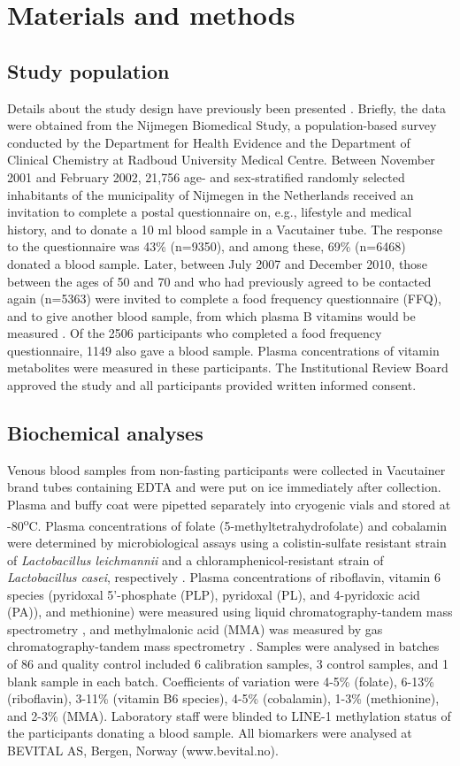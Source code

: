 \section{Materials and methods} %
\subsection{Study population}
\noindent Details about the study design have previously been presented \cite{c321}. Briefly, the data were obtained from the Nijmegen Biomedical Study, a population-based survey conducted by the Department for Health Evidence and the Department of Clinical Chemistry at Radboud University Medical Centre. Between November 2001 and February 2002, 21,756 age- and sex-stratified randomly selected inhabitants of the municipality of Nijmegen in the Netherlands received an invitation to complete a postal questionnaire on, e.g., lifestyle and medical history, and to donate a 10 ml blood sample in a Vacutainer tube. The response to the questionnaire was 43\% (n=9350), and among these, 69\% (n=6468) donated a blood sample. Later, between July 2007 and December 2010, those between the ages of 50 and 70 and who had previously agreed to be contacted again (n=5363) were invited to complete a food frequency questionnaire (FFQ), and to give another blood sample, from which plasma B vitamins would be measured \cite{c322}. Of the 2506 participants who completed a food frequency questionnaire, 1149 also gave a blood sample. Plasma concentrations of vitamin metabolites were measured in these participants. The Institutional Review Board approved the study and all participants provided written informed consent.

\subsection{Biochemical analyses} %
\noindent Venous blood samples from non-fasting participants were collected in Vacutainer brand tubes containing EDTA and were put on ice immediately after collection. Plasma and buffy coat were pipetted separately into cryogenic vials and stored at -80\textsuperscript{o}C. Plasma concentrations of folate (5-methyltetrahydrofolate) and cobalamin were determined by microbiological assays using a colistin-sulfate resistant strain of \emph{Lactobacillus leichmannii} and a chloramphenicol-resistant strain of \emph{Lactobacillus casei}, respectively \cite{c323,c324}. Plasma concentrations of riboflavin, vitamin 6 species (pyridoxal 5'-phosphate (PLP), pyridoxal (PL), and 4-pyridoxic acid (PA)), and methionine) were measured using liquid chromatography-tandem mass spectrometry \cite{c325,c326}, and methylmalonic acid (MMA) was measured by gas chromatography-tandem mass spectrometry \cite{c327}. Samples were analysed in batches of 86 and quality control included 6 calibration samples, 3 control samples, and 1 blank sample in each batch. Coefficients of variation were 4-5\% (folate), 6-13\% (riboflavin), 3-11\% (vitamin B6 species), 4-5\% (cobalamin), 1-3\% (methionine), and 2-3\% (MMA). Laboratory staff were blinded to LINE-1 methylation status of the participants donating a blood sample. All biomarkers were analysed at BEVITAL AS, Bergen, Norway (www.bevital.no).

